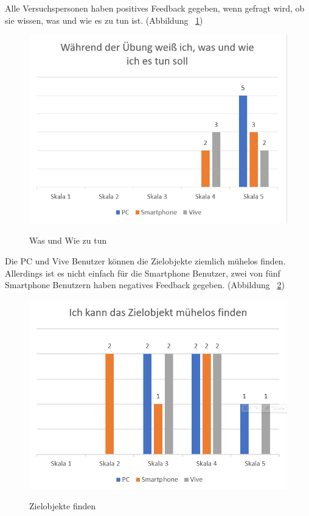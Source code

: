 Alle Versuchspersonen haben positives Feedback gegeben, wenn gefragt wird, ob sie wissen, was und wie es zu tun ist. (Abbildung ~\ref{fig:wasWie})

\begin{figure}[ht]
\vspace*{1em}
\centering
\caption{Was und Wie zu tun}
\includegraphics[width= \textwidth]{images/wasWie.png}
\label{fig:wasWie} 
\end{figure}

Die PC und Vive Benutzer können die Zielobjekte ziemlich mühelos finden. Allerdings ist es nicht einfach für die Smartphone Benutzer, zwei von fünf Smartphone Benutzern haben negatives Feedback gegeben. (Abbildung ~\ref{fig:muehelosFinden})

\begin{figure}[ht]
\vspace*{1em}
\centering
\caption{Zielobjekte finden}
\includegraphics[width= \textwidth]{images/mueelosFinden.png}
\label{fig:muehelosFinden} 
\end{figure}

